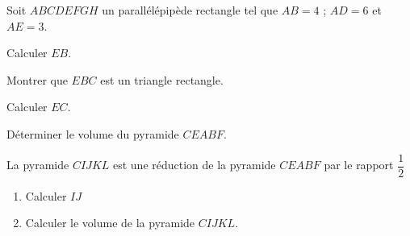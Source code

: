 \documentclass[a4paper,12pt]{article}
\begin{document}
\begin{exo}
\begin{enumerate}
\begin{minipage}{.7\linewidth}
\begin{EnvUplevel}
Soit $ABCDEFGH$ un parallélépipède rectangle tel que $AB=4$ ; $AD=6$ et $AE=3$.
\end{EnvUplevel}
\item Calculer $EB$.
\item Montrer que $EBC$ est un triangle rectangle.
\item Calculer $EC$.
\item Déterminer le volume du pyramide $CEABF$.
\item La pyramide $CIJKL$ est une réduction de la pyramide $CEABF$ par le rapport $\dfrac{1}{2}$ 
\begin{enumerate}
\item Calculer $IJ$
\item Calculer le volume de la pyramide $CIJKL$.
\end{enumerate}
\end{minipage}%
\begin{minipage}{.3\linewidth}
\begin{EnvFullwidth}
\end{EnvFullwidth}
\end{minipage}
\end{enumerate}
\end{exo}
\end{document}
